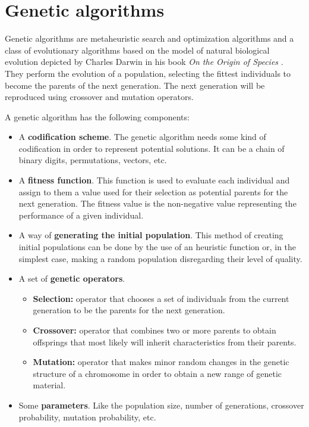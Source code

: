\documentclass[11pt]{llncs}
\begin{document}
\section{Genetic algorithms}\label{gen_algs}
Genetic algorithms \cite{ag_tutorial} are metaheuristic search and optimization algorithms and a class of evolutionary algorithms based on the model of natural biological evolution depicted by Charles Darwin in his book \textit{On the Origin of Species} \cite{darwin}. They perform the evolution of a population, selecting the fittest individuals to become the parents of the next generation. The next generation will be reproduced using crossover and mutation operators.

A genetic algorithm has the following components:
\begin{itemize}
    \item A \textbf{codification scheme}. The genetic algorithm needs some kind of codification in order to represent potential solutions. It can be a chain of binary digits, permutations, vectors, etc. 
    \item A \textbf{fitness function}. This function is used to evaluate each individual and assign to them a value used for their selection as potential parents for the next generation. The fitness value is the non-negative value representing the performance of a given individual.
    \item A way of \textbf{generating the initial population}. This method of creating initial populations can be done by the use of an heuristic function or, in the simplest case, making a random population disregarding their level of quality.
    \item A set of \textbf{genetic operators}. 
    \begin{itemize}
        \item \textbf{Selection:} operator that chooses a set of individuals from the current generation to be the parents for the next generation.
        \item \textbf{Crossover:} operator that combines two or more parents to obtain offsprings that most likely will inherit characteristics from their parents.
        \item \textbf{Mutation:} operator that makes minor random changes in the genetic structure of a chromosome in order to obtain a new range of genetic material.
    \end{itemize}
    \item Some \textbf{parameters}. Like the population size, number of generations, crossover probability, mutation probability, etc.
\end{itemize}
\end{document}
